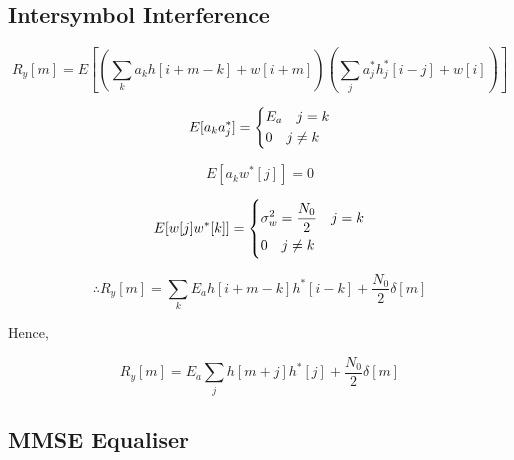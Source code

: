 \subsection{Intersymbol Interference}

\begin{equation}
    \label{eqn:expl-0}
    R_y[m] = E[(\sum_{k}a_kh[i+m-k]+w[i+m])(\sum_j a_j^* h_j^*[i-j]+w[i])]
\end{equation}

\begin{equation}
    \label{eqn:expl-1}
    E[a_k a_j^*] =
    \begin{dcases}
        E_a \quad j=k \\
        0 \quad j \neq k
    \end{dcases}
\end{equation}

\begin{equation}
    \label{eqn:expl-2}
    E[a_k w^*[j]] = 0
\end{equation}

\begin{equation}
    \label{eqn:expl-3}
    E[w[j]w^*[k]] =
    \begin{dcases}
        \sigma_w^2 = \frac{N_0}{2} \quad j=k \\
        0 \quad j \neq k
    \end{dcases}
\end{equation}

\begin{equation}
    \label{eqn:expl-4}
    \therefore R_y[m] = \sum_k E_a h[i+m-k]h^*[i-k]+ \frac{N_0}{2}\delta [m]
\end{equation}

Hence,

\begin{equation}
    \label{eqn:expl-5}
    R_y[m] = E_a \sum_j h[m+j]h^*[j] + \frac{N_0}{2} \delta [m]
\end{equation}

\subsection{MMSE Equaliser}

